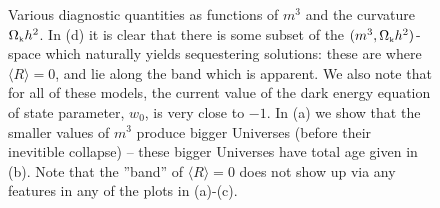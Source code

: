\documentclass[amsmath,amssymb,12pt,eqsecnum]{revtex4}
\begin{document}
\begin{figure}[!t]
\begin{center}
      \end{center}
\caption{ Various diagnostic quantities as functions of $m^3$ and the curvature ${\Omega}_{\scriptscriptstyle{\textrm{k}}}h^2$. In (d) it is clear that there is some subset of the $(m^3, {\Omega}_{\scriptscriptstyle{\textrm{k}}}h^2)$-space which naturally yields sequestering solutions: these are where $\langle R\rangle = 0$, and lie along the band which is apparent. We also note that for all of these models, the current value of the dark energy equation of state parameter, $w_0$, is very close to $-1$. In (a) we show that the smaller values of $m^3$ produce bigger Universes (before their inevitible collapse) -- these bigger Universes have total age given in (b). Note that the ''band'' of $\langle R\rangle = 0$ does not show up via any features in any of the plots in (a)-(c).}\label{fig:plots1}
\end{figure}
\end{document}
